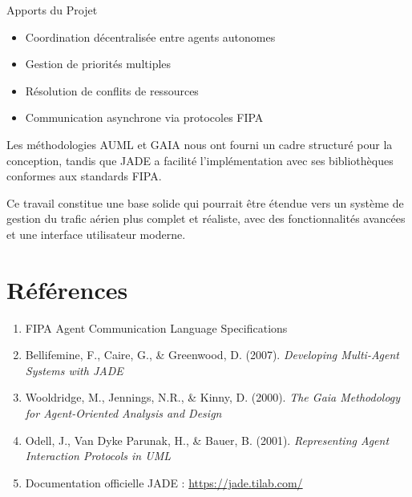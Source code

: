 \documentclass[12pt,a4paper]{article}
\begin{document}
\begin{infobox}{Apports du Projet}
\begin{itemize}[leftmargin=*]
    \item Coordination décentralisée entre agents autonomes
    \item Gestion de priorités multiples
    \item Résolution de conflits de ressources
    \item Communication asynchrone via protocoles FIPA
\end{itemize}
\end{infobox}

Les méthodologies AUML et GAIA nous ont fourni un cadre structuré pour la conception, tandis que JADE a facilité l'implémentation avec ses bibliothèques conformes aux standards FIPA.

Ce travail constitue une base solide qui pourrait être étendue vers un système de gestion du trafic aérien plus complet et réaliste, avec des fonctionnalités avancées et une interface utilisateur moderne.

\section*{Références}

\begin{enumerate}[leftmargin=*]
    \item FIPA Agent Communication Language Specifications
    \item Bellifemine, F., Caire, G., \& Greenwood, D. (2007). \textit{Developing Multi-Agent Systems with JADE}
    \item Wooldridge, M., Jennings, N.R., \& Kinny, D. (2000). \textit{The Gaia Methodology for Agent-Oriented Analysis and Design}
    \item Odell, J., Van Dyke Parunak, H., \& Bauer, B. (2001). \textit{Representing Agent Interaction Protocols in UML}
    \item Documentation officielle JADE : \url{https://jade.tilab.com/}
\end{enumerate}
\end{document}
